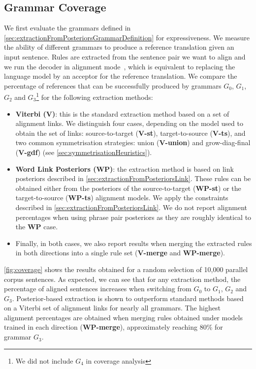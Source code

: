 \subsection{Grammar Coverage}
\label{sec:grammarcoverage}

We first evaluate the grammars defined in \autoref{sec:extractionFromPosteriorsGrammarDefinition} for expressiveness.
We measure
the ability of different grammars to produce a reference translation given an
input sentence. Rules are extracted from the sentence pair we want to align and
we run the decoder in alignment
mode~\citep{degispert-iglesias-blackwood-banga-byrne:2010:CL}, which is
equivalent to replacing the language model by an acceptor for the reference
translation. We compare the percentage of references that can be successfully
produced by grammars $G_0$, $G_1$, $G_2$ and
$G_3$\footnote{We did not include $G_4$ in coverage analysis} for the following
extraction methods:
%
\begin{itemize}
  \item \textbf{Viterbi (V)}: this is the standard extraction method based on a set
of alignment links. We distinguish four cases, depending on the model used to
obtain the set of links: source-to-target ({\bf V-st}), target-to-source
({\bf V-ts}), and two common symmetrisation strategies: union ({\bf V-union})
and grow-diag-final ({\bf V-gdf}) (see \autoref{sec:symmetrisationHeuristics}).
  \item \textbf{Word Link Posteriors (WP)}: the extraction method is based on link
posteriors described in \autoref{sec:extractionFromPosteriorsLink}. These
rules can be obtained either from the posteriors of the source-to-target
({\bf WP-st}) or the target-to-source ({\bf WP-ts}) alignment models. We apply
the constraints described in \autoref{sec:extractionFromPosteriorsLink}. We
do not report alignment percentages when using phrase pair posteriors as they
are roughly identical to the {\bf WP} case.
  \item Finally, in both cases, we also report results when merging the
extracted rules in both directions into a single rule set ({\bf V-merge} and
{\bf WP-merge}).
\end{itemize}
%
\autoref{fig:coverage} shows the results obtained for a random selection of
10,000 parallel corpus sentences. As expected, we can see that for any
extraction method, the percentage of aligned sentences increases when switching
from $G_0$ to $G_1$, $G_2$ and $G_3$. Posterior-based extraction is shown to
outperform standard methods based on a Viterbi set of alignment links for nearly
all grammars. The highest alignment percentages are obtained when merging rules
obtained under models trained in each direction ({\bf WP-merge}), approximately
reaching 80\% for grammar $G_3$.

